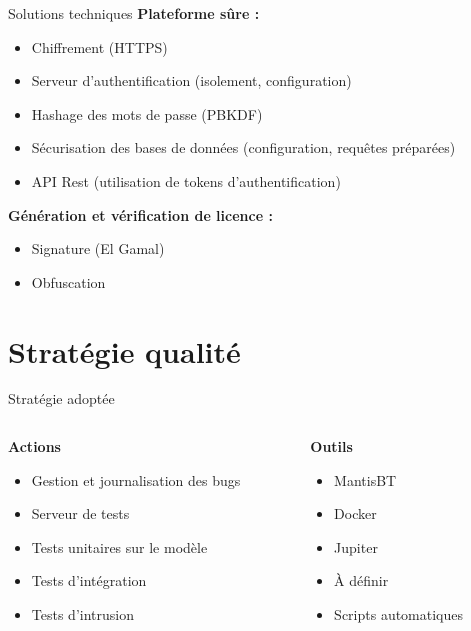 \documentclass{cubeamer}
\begin{document}
\begin{frame}{Solutions techniques}
    \textbf{Plateforme sûre :}
    \begin{itemize}
        \item Chiffrement (HTTPS)
        \item Serveur d'authentification (isolement, configuration)
        \item Hashage des mots de passe (PBKDF)
        \item Sécurisation des bases de données (configuration, requêtes préparées)
        \item API Rest (utilisation de tokens d'authentification)
    \end{itemize}
    \textbf{Génération et vérification de licence :}
    \begin{itemize}
        \item Signature (El Gamal)
        \item Obfuscation
    \end{itemize}
\end{frame}    

\section{Stratégie qualité} %

\begin{frame}{Stratégie adoptée}
    \begin{columns}
        \begin{column}{0.54\textwidth}
            \textbf{Actions}
            \begin{itemize}
                \item Gestion et journalisation des bugs
                \item Serveur de tests
                \item Tests unitaires sur le modèle
                \item Tests d'intégration
                \item Tests d'intrusion
            \end{itemize}
        \end{column}
        \begin{column}{0.46\textwidth}
            \textbf{Outils}
            \begin{itemize}
                \item MantisBT
                \item Docker
                \item Jupiter
                \item À définir
                \item Scripts automatiques
            \end{itemize}
        \end{column}
    \end{columns}
\end{frame}
\end{document}
